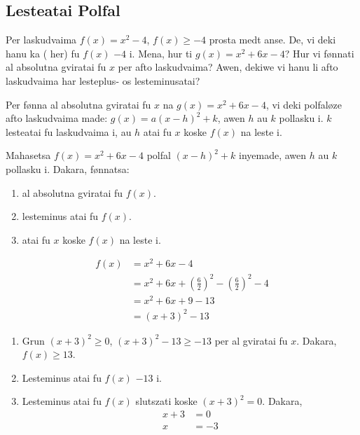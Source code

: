 \subsection{Lesteatai Polfal}
Per laskudvaima \(f\left(x\right) = x^2-4\), \(f\left(x\right)\geq-4\) prosta medt anse. De, vi deki hanu
ka  ( her) fu \(f\left(x\right)\) \(-4\) i. Mena, hur ti
\(g\left(x\right) = x^2+6x-4\)? Hur vi fønnati al absolutna gviratai fu \(x\) per afto laskudvaima?
Awen, dekiwe vi hanu li afto laskudvaima har lesteplus- os lesteminusatai?

Per fønna al absolutna gviratai fu \(x\) na \(g\left(x\right)=x^2+6x-4\), vi deki polfaløze afto
laskudvaima  made: \(g\left(x\right) = a{\left(x-h\right)}^2+k\), awen
\(h\) au \(k\) pollasku i. \(k\) lesteatai fu laskudvaima i, au \(h\) atai fu \(x\) koske \(f\left(x\right)\)
na leste i.

\begin{tatoeba}
  Mahasetsa \(f\left(x\right)=x^2+6x-4\) polfal \({\left(x-h\right)}^2+k\) inyemade,
  awen \(h\) au \(k\) pollasku i. Dakara, fønnatsa:
  \begin{enumerate}
    \item al absolutna gviratai fu \(f\left(x\right)\).
    \item lesteminus atai fu \(f\left(x\right)\).
    \item atai fu \(x\) koske \(f\left(x\right)\) na leste i.
  \end{enumerate}
\end{tatoeba}
\begin{svarna}
  \begin{align*}
    f(x) &= x^2 + 6x - 4 \\
    &= x^2 + 6x + \left(\frac{6}{2}\right)^2 - \left(\frac{6}{2}\right)^2 - 4 \\ 
    &= x^2 + 6x + 9 - 13 \\
    &= {\left(x+3\right)}^2 - 13
  \end{align*}
  \begin{enumerate}
    \item Grun \({\left(x+3\right)}^2\geq0\), \({\left(x+3\right)}^2-13\geq-13\) per al gviratai fu \(x\). Dakara, \(f\left(x\right)\geq13\).
    \item Lesteminus atai fu \(f\left(x\right)\) \(-13\) i.
    \item Lesteminus atai fu \(f\left(x\right)\) slutszati koske \({\left(x+3\right)}^2=0\). Dakara,
  \begin{align*}
    x + 3 &= 0 \\
    x &= -3
  \end{align*}
  \end{enumerate}
\end{svarna}

